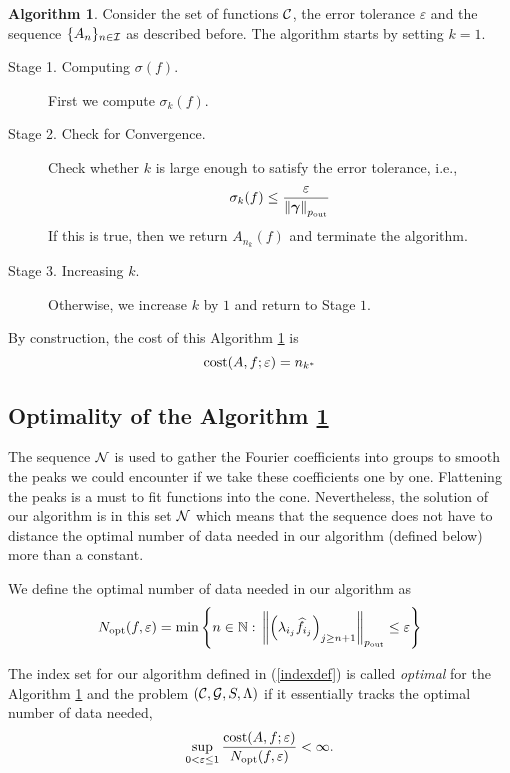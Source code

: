 \documentclass[final]{elsarticle}
\newcommand{\pout}{p_{\text{\rm{out}}}}
\newcommand{\bgamma}{\boldsymbol\gamma}
\theoremstyle{definition}
\newtheorem{algo}{Algorithm}
\theoremstyle{remark}
\begin{document}
\begin{algo}\label{algo2}
 Consider the set of functions $\mathcal{C}$, the error tolerance $\varepsilon$ and the sequence $\{A_n\}_{n \in \mathcal{I}}$ as described before.
The algorithm starts by setting $k=1$.
\begin{description}
\item[Stage 1. Computing $\sigma(f)$.] First we compute $\sigma_{k}(f)$.
\item[Stage 2. Check for Convergence.] Check whether $k$ is large enough to satisfy the error tolerance, i.e.,
    \begin{equation}
          \sigma_{k}(f) \le \frac{\varepsilon}{\norm[\pout]{\bgamma}}
    \end{equation}
    If this is true, then we return $A_{n_{k}}(f)$ and terminate the algorithm.
\item[Stage 3. Increasing $k$.] Otherwise, we increase $k$ by $1$ and return to Stage $1$.
\end{description}
\end{algo}

 By construction, the cost of this Algorithm \ref{algo2} is
\begin{equation}\label{costalgo}
\operatorname{cost}(A,f;\varepsilon)=n_{k^*}
\end{equation}

\subsection{Optimality of the Algorithm \ref{algo2}}

The sequence $\mathcal{N}$ is used to gather the Fourier coefficients into groups to smooth the peaks we could encounter if we take these coefficients one by one. Flattening the peaks is a must to fit functions into the cone. Nevertheless, the solution of our algorithm is in this set $\mathcal{N}$ which means that the sequence does not have to distance the optimal number of data needed in our algorithm (defined below) more than a constant.

We define the optimal number of data needed in our algorithm as
\begin{equation*}
N_{\opt}(f,\varepsilon)=\min\left\{n\in\naturals:\,\norm[\pout]{\left(\lambda_{i_j} \hf_{i_j} \right)_{j\ge n+1}} \le \varepsilon \right\}
\end{equation*}

The index set for our algorithm defined in (\ref{indexdef}) is called \emph{optimal} for the Algorithm \ref{algo2} and the problem $(\mathcal{C},\mathcal{G},S,\Lambda)$ if it essentially tracks the optimal number of data needed,
\begin{equation} \label{nearoptdef}
\sup_{0 < \varepsilon \le 1} \frac{\operatorname{cost}(A,f;\varepsilon)} {N_{\operatorname{opt}}(f,\varepsilon)} <\infty.
\end{equation}
\end{document}

